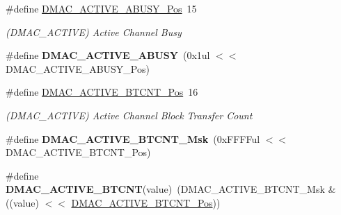 \begin{DoxyCompactItemize}
\item 
\hypertarget{group___s_a_m_l21___d_m_a_c_gacba9c3ae57a373db30cb2a23da32afc2}{}\#define \hyperlink{group___s_a_m_l21___d_m_a_c_gacba9c3ae57a373db30cb2a23da32afc2}{D\+M\+A\+C\+\_\+\+A\+C\+T\+I\+V\+E\+\_\+\+A\+B\+U\+S\+Y\+\_\+\+Pos}~15\label{group___s_a_m_l21___d_m_a_c_gacba9c3ae57a373db30cb2a23da32afc2}

\begin{DoxyCompactList}\small\item\em (D\+M\+A\+C\+\_\+\+A\+C\+T\+I\+V\+E) Active Channel Busy \end{DoxyCompactList}\item 
\hypertarget{group___s_a_m_l21___d_m_a_c_gacf7b57bf2c4f5afc1078240c4f80dd0d}{}\#define {\bfseries D\+M\+A\+C\+\_\+\+A\+C\+T\+I\+V\+E\+\_\+\+A\+B\+U\+S\+Y}~(0x1ul $<$$<$ D\+M\+A\+C\+\_\+\+A\+C\+T\+I\+V\+E\+\_\+\+A\+B\+U\+S\+Y\+\_\+\+Pos)\label{group___s_a_m_l21___d_m_a_c_gacf7b57bf2c4f5afc1078240c4f80dd0d}

\item 
\hypertarget{group___s_a_m_l21___d_m_a_c_ga56eec24c6439c5c97c6647fefce53b2c}{}\#define \hyperlink{group___s_a_m_l21___d_m_a_c_ga56eec24c6439c5c97c6647fefce53b2c}{D\+M\+A\+C\+\_\+\+A\+C\+T\+I\+V\+E\+\_\+\+B\+T\+C\+N\+T\+\_\+\+Pos}~16\label{group___s_a_m_l21___d_m_a_c_ga56eec24c6439c5c97c6647fefce53b2c}

\begin{DoxyCompactList}\small\item\em (D\+M\+A\+C\+\_\+\+A\+C\+T\+I\+V\+E) Active Channel Block Transfer Count \end{DoxyCompactList}\item 
\hypertarget{group___s_a_m_l21___d_m_a_c_ga3488f20c938ac62e2263798c6e3d123f}{}\#define {\bfseries D\+M\+A\+C\+\_\+\+A\+C\+T\+I\+V\+E\+\_\+\+B\+T\+C\+N\+T\+\_\+\+Msk}~(0x\+F\+F\+F\+Ful $<$$<$ D\+M\+A\+C\+\_\+\+A\+C\+T\+I\+V\+E\+\_\+\+B\+T\+C\+N\+T\+\_\+\+Pos)\label{group___s_a_m_l21___d_m_a_c_ga3488f20c938ac62e2263798c6e3d123f}

\item 
\hypertarget{group___s_a_m_l21___d_m_a_c_ga1476f81f7dee445b1957238b97a75404}{}\#define {\bfseries D\+M\+A\+C\+\_\+\+A\+C\+T\+I\+V\+E\+\_\+\+B\+T\+C\+N\+T}(value)~(D\+M\+A\+C\+\_\+\+A\+C\+T\+I\+V\+E\+\_\+\+B\+T\+C\+N\+T\+\_\+\+Msk \& ((value) $<$$<$ \hyperlink{group___s_a_m_l21___d_m_a_c_ga56eec24c6439c5c97c6647fefce53b2c}{D\+M\+A\+C\+\_\+\+A\+C\+T\+I\+V\+E\+\_\+\+B\+T\+C\+N\+T\+\_\+\+Pos}))\label{group___s_a_m_l21___d_m_a_c_ga1476f81f7dee445b1957238b97a75404}


\end{DoxyCompactItemize}
